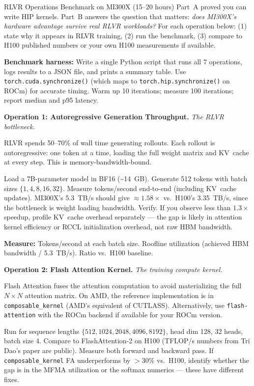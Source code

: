 \begin{exercise}{RLVR Operations Benchmark on MI300X (15--20 hours)}
Part~A proved you can write HIP kernels. Part~B answers the question that matters: \textit{does MI300X's hardware advantage survive real RLVR workloads?} For each operation below: (1) state why it appears in RLVR training, (2) run the benchmark, (3) compare to H100 published numbers or your own H100 measurements if available.

\textbf{Benchmark harness:} Write a single Python script that runs all 7 operations, logs results to a JSON file, and prints a summary table. Use \texttt{torch.cuda.synchronize()} (which maps to \texttt{torch.hip.synchronize()} on ROCm) for accurate timing. Warm up 10 iterations; measure 100 iterations; report median and p95 latency.

\medskip
\textbf{Operation 1: Autoregressive Generation Throughput.} \textit{The RLVR bottleneck.}

RLVR spends 50--70\% of wall time generating rollouts. Each rollout is autoregressive: one token at a time, loading the full weight matrix and KV~cache at every step. This is memory-bandwidth-bound.

Load a 7B-parameter model in BF16 (\textasciitilde{}14~GB). Generate 512 tokens with batch sizes $\{1, 4, 8, 16, 32\}$. Measure tokens/second end-to-end (including KV~cache updates). MI300X's 5.3~TB/s should give $\approx 1.58\times$ vs.\ H100's 3.35~TB/s, since the bottleneck is weight loading bandwidth. Verify. If you observe less than $1.3\times$ speedup, profile KV~cache overhead separately --- the gap is likely in attention kernel efficiency or RCCL initialization overhead, not raw HBM bandwidth.

\textbf{Measure:} Tokens/second at each batch size. Roofline utilization (achieved HBM bandwidth / 5.3~TB/s). Ratio vs.\ H100 baseline.

\medskip
\textbf{Operation 2: Flash Attention Kernel.} \textit{The training compute kernel.}

Flash Attention fuses the attention computation to avoid materializing the full $N \times N$ attention matrix. On AMD, the reference implementation is in \texttt{composable\_kernel} (AMD's equivalent of CUTLASS). Alternatively, use \texttt{flash-attention} with the ROCm backend if available for your ROCm version.

Run for sequence lengths $\{512, 1024, 2048, 4096, 8192\}$, head dim 128, 32 heads, batch size 4. Compare to FlashAttention-2 on H100 (TFLOP/s numbers from Tri Dao's paper are public). Measure both forward and backward pass. If \texttt{composable\_kernel} FA underperforms by $>30\%$ vs.\ H100, identify whether the gap is in the MFMA utilization or the softmax numerics --- these have different fixes.


\end{exercise}
